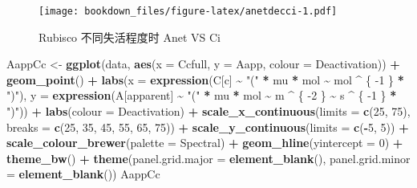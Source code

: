 \documentclass[
]{krantz}
\makeatletter
\newenvironment{Shaded}{\begin{snugshade}}{\end{snugshade}}
\newcommand{\DataTypeTok}[1]{\textcolor[rgb]{0.13,0.29,0.53}{#1}}
\newcommand{\DecValTok}[1]{\textcolor[rgb]{0.00,0.00,0.81}{#1}}
\newcommand{\KeywordTok}[1]{\textcolor[rgb]{0.13,0.29,0.53}{\textbf{#1}}}
\newcommand{\NormalTok}[1]{#1}
\newcommand{\OperatorTok}[1]{\textcolor[rgb]{0.81,0.36,0.00}{\textbf{#1}}}
\newcommand{\StringTok}[1]{\textcolor[rgb]{0.31,0.60,0.02}{#1}}
\newenvironment{kframe}{%
\medskip{}
\setlength{\fboxsep}{.8em}
 \def\at@end@of@kframe{}%
 \ifinner\ifhmode%
  \def\at@end@of@kframe{\end{minipage}}%
  \begin{minipage}{\columnwidth}%
 \fi\fi%
 \def\FrameCommand##1{\hskip\@totalleftmargin \hskip-\fboxsep
 \colorbox{shadecolor}{##1}\hskip-\fboxsep
     \hskip-\linewidth \hskip-\@totalleftmargin \hskip\columnwidth}%
 \MakeFramed {\advance\hsize-\width
   \@totalleftmargin\z@ \linewidth\hsize
   \@setminipage}}%
 {\par\unskip\endMakeFramed%
 \at@end@of@kframe}
\renewenvironment{Shaded}{\begin{kframe}}{\end{kframe}}
\makeatother
\begin{document}
\begin{figure}
\centering
\texttt{[image: bookdown\_files/figure-latex/anetdecci-1.pdf]}
\caption{\label{fig:anetdecci}Rubisco 不同失活程度时 Anet VS Ci}
\end{figure}

\begin{Shaded}
\begin{Highlighting}[]
\NormalTok{AappCc \textless{}{-}}
\StringTok{  }\KeywordTok{ggplot}\NormalTok{(data, }\KeywordTok{aes}\NormalTok{(}\DataTypeTok{x =}\NormalTok{ Ccfull, }\DataTypeTok{y =}\NormalTok{ Aapp, }\DataTypeTok{colour =}\NormalTok{ Deactivation)) }\OperatorTok{+}
\StringTok{  }\KeywordTok{geom\_point}\NormalTok{() }\OperatorTok{+}
\StringTok{  }\KeywordTok{labs}\NormalTok{(}\DataTypeTok{x =} \KeywordTok{expression}\NormalTok{(C[c] }\OperatorTok{\textasciitilde{}}\StringTok{ "("} \OperatorTok{*}\StringTok{ }\NormalTok{mu }\OperatorTok{*}\StringTok{ }\NormalTok{mol }\OperatorTok{\textasciitilde{}}\StringTok{ }\NormalTok{mol }\OperatorTok{\^{}}\StringTok{ }\NormalTok{\{}
    \DecValTok{{-}1}
\NormalTok{  \} }\OperatorTok{*}\StringTok{ ")"}\NormalTok{),}
  \DataTypeTok{y =} \KeywordTok{expression}\NormalTok{(A[apparent] }\OperatorTok{\textasciitilde{}}\StringTok{ "("} \OperatorTok{*}\StringTok{ }\NormalTok{mu }\OperatorTok{*}\StringTok{ }\NormalTok{mol }\OperatorTok{\textasciitilde{}}\StringTok{ }\NormalTok{m }\OperatorTok{\^{}}\StringTok{ }\NormalTok{\{}
    \DecValTok{{-}2}
\NormalTok{  \} }\OperatorTok{\textasciitilde{}}\StringTok{ }\NormalTok{s }\OperatorTok{\^{}}\StringTok{ }\NormalTok{\{}
    \DecValTok{{-}1}
\NormalTok{  \} }\OperatorTok{*}\StringTok{ ")"}\NormalTok{)) }\OperatorTok{+}
\StringTok{  }\KeywordTok{labs}\NormalTok{(}\DataTypeTok{colour =} \StringTok{\textquotesingle{}Deactivation\textquotesingle{}}\NormalTok{) }\OperatorTok{+}
\StringTok{  }\KeywordTok{scale\_x\_continuous}\NormalTok{(}\DataTypeTok{limits =} \KeywordTok{c}\NormalTok{(}\DecValTok{25}\NormalTok{, }\DecValTok{75}\NormalTok{),}
                     \DataTypeTok{breaks =} \KeywordTok{c}\NormalTok{(}\DecValTok{25}\NormalTok{, }\DecValTok{35}\NormalTok{, }\DecValTok{45}\NormalTok{, }\DecValTok{55}\NormalTok{, }\DecValTok{65}\NormalTok{, }\DecValTok{75}\NormalTok{)) }\OperatorTok{+}
\StringTok{  }\KeywordTok{scale\_y\_continuous}\NormalTok{(}\DataTypeTok{limits =} \KeywordTok{c}\NormalTok{(}\OperatorTok{{-}}\DecValTok{5}\NormalTok{, }\DecValTok{5}\NormalTok{)) }\OperatorTok{+}
\StringTok{  }\KeywordTok{scale\_colour\_brewer}\NormalTok{(}\DataTypeTok{palette =} \StringTok{\textquotesingle{}Spectral\textquotesingle{}}\NormalTok{) }\OperatorTok{+}
\StringTok{  }\KeywordTok{geom\_hline}\NormalTok{(}\DataTypeTok{yintercept =} \DecValTok{0}\NormalTok{) }\OperatorTok{+}
\StringTok{  }\KeywordTok{theme\_bw}\NormalTok{() }\OperatorTok{+}
\StringTok{  }\KeywordTok{theme}\NormalTok{(}\DataTypeTok{panel.grid.major =} \KeywordTok{element\_blank}\NormalTok{(),}
        \DataTypeTok{panel.grid.minor =} \KeywordTok{element\_blank}\NormalTok{())}
\NormalTok{AappCc}
\end{Highlighting}
\end{Shaded}
\end{document}
